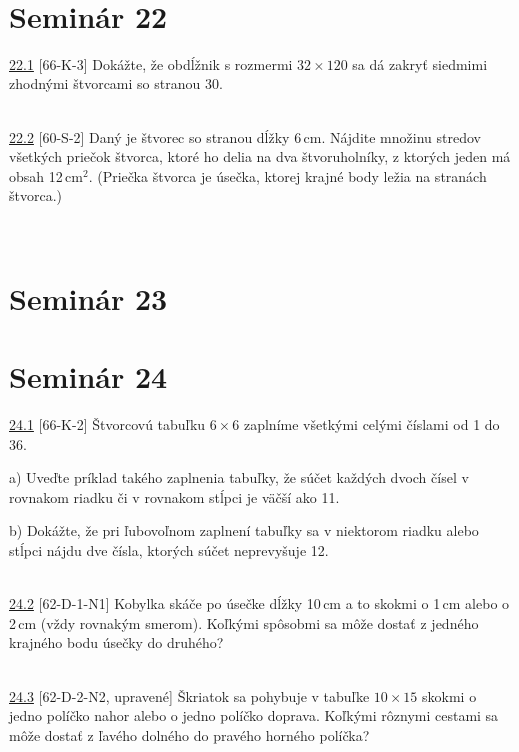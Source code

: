 \\

\section*{Seminár 22}

\noindent \ul{22.1} [66-K-3] Dokážte, že obdĺžnik s rozmermi $32 \times 120$ sa dá zakryť siedmimi zhodnými štvorcami so stranou 30.


\\

\noindent \ul{22.2} [60-S-2]  Daný je štvorec so stranou dĺžky 6\,cm. Nájdite množinu stredov všetkých priečok štvorca, ktoré ho delia na dva štvoruholníky, z ktorých jeden má obsah 12\,cm$^2$. (Priečka štvorca je úsečka, ktorej krajné body ležia na stranách štvorca.)


\\

\section*{Seminár 23}

\section*{Seminár 24}

\noindent \ul{24.1} [66-K-2]
Štvorcovú tabuľku $6\times 6$ zaplníme všetkými celými číslami od 1 do 36.

a) Uveďte príklad takého zaplnenia tabuľky, že súčet každých dvoch čísel v rovnakom riadku či v rovnakom stĺpci je väčší ako 11.

b) Dokážte, že pri ľubovoľnom zaplnení tabuľky sa v niektorom riadku alebo stĺpci nájdu dve čísla, ktorých súčet neprevyšuje 12.


\\

\noindent \ul{24.2} [62-D-1-N1]
Kobylka skáče po úsečke dĺžky 10\,cm a to skokmi o 1\,cm alebo o 2\,cm (vždy rovnakým smerom). Koľkými spôsobmi sa môže dostať z jedného krajného bodu úsečky do druhého?


\\

\noindent \ul{24.3} [62-D-2-N2, upravené] Škriatok sa pohybuje v tabuľke $10 \times 15$ skokmi o jedno políčko nahor alebo o jedno políčko doprava. Koľkými rôznymi cestami sa môže dostať z ľavého dolného do pravého horného políčka?\


\\

